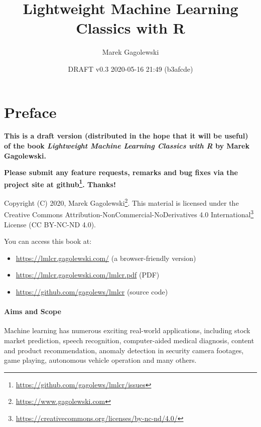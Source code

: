 \documentclass[10pt,b5paper,krantz1]{krantz}
\title{Lightweight Machine Learning Classics with R}
\author{Marek Gagolewski}
\date{DRAFT v0.3 2020-05-16 21:49 (b3afcde)}
\providecommand{\tightlist}{%
  \setlength{\itemsep}{0pt}\setlength{\parskip}{0pt}}
\renewenvironment{quote}{\begin{VF}}{\end{VF}}
\renewcommand{\href}[2]{#2\footnote{\url{#1}}}
\begin{document}
\maketitle

{
\setcounter{tocdepth}{2}
\tableofcontents
}
\listoftables
\listoffigures
\hypertarget{preface}{%
\chapter*{Preface}\label{preface}}


\begin{quote}
\textbf{This is a draft version (distributed in the hope that it will be useful)
of the book \emph{Lightweight Machine Learning Classics with R}
by Marek Gagolewski.}
\end{quote}

\begin{quote}
\textbf{Please submit any feature requests, remarks and bug fixes
via the project site at \href{https://github.com/gagolews/lmlcr/issues}{github}. Thanks!}
\end{quote}

Copyright (C) 2020, \href{https://www.gagolewski.com}{Marek Gagolewski}.
This material is licensed under the Creative Commons
\href{https://creativecommons.org/licenses/by-nc-nd/4.0/}{Attribution-NonCommercial-NoDerivatives 4.0 International}
License (CC BY-NC-ND 4.0).

You can access this book at:

\begin{itemize}
\tightlist
\item
  \url{https://lmlcr.gagolewski.com/} (a browser-friendly version)
\item
  \url{https://lmlcr.gagolewski.com/lmlcr.pdf} (PDF)
\item
  \url{https://github.com/gagolews/lmlcr} (source code)
\end{itemize}

\hypertarget{aims-and-scope}{%
\subsubsection*{Aims and Scope}\label{aims-and-scope}}


Machine learning has numerous exciting real-world applications,
including stock market prediction, speech recognition,
computer-aided medical diagnosis, content and product recommendation,
anomaly detection in security camera footages, game playing,
autonomous vehicle operation and many others.
\end{document}
